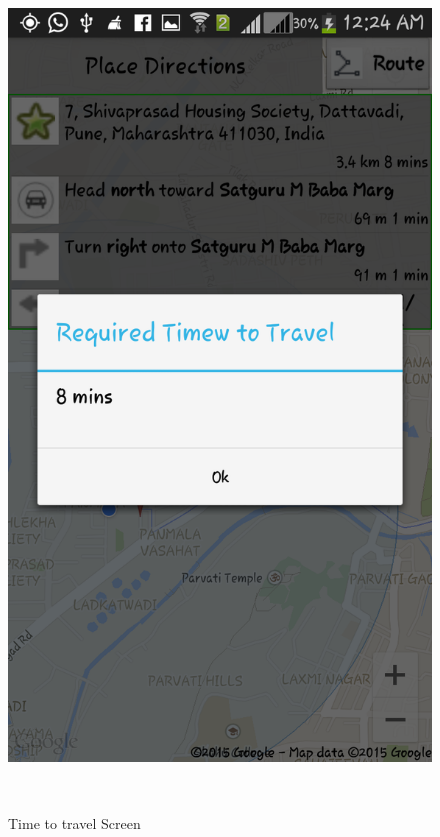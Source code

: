 \documentclass[12pt,a4paper]{article}
\begin{document}
\begin{figure}[!htb]
\includegraphics[width=12 cm]{time}
\caption{Time to travel Screen}
\\

\end{figure}
\end{document}
